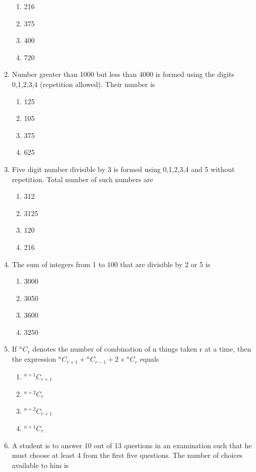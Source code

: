 \documentclass[journal,12pt,twocolumn]{IEEEtran}
\newcommand*{\Comb}[2]{{}^{#1}C_{#2}}%
\begin{document}
\begin{enumerate}
\begin{enumerate}
\item 216
\item 375
\item 400
\item 720
\end{enumerate}
\item Number greater than 1000 but less than 4000 is formed using the digits 0,1,2,3,4 (repetition allowed). Their number is 
\begin{enumerate}
\item 125
\item 105 
\item 375
\item 625\\
\end{enumerate}
\item Five digit number divisible by 3 is formed using 0,1,2,3,4 and 5 without repetition. Total number of such numbers are
\begin{enumerate}
\item 312
\item 3125 
\item 120
\item 216\\
\end{enumerate}
\item The sum of integers from 1 to 100 that are divisible by 2 or 5 is
\begin{enumerate}
\item 3000
\item 3050
\item 3600
\item 3250\\
\end{enumerate}
\item If $\Comb{n}{r}$ denotes the number of combination of n things taken r at a time, then the expression $\Comb{n}{r+1}+\Comb{n}{r-1}+2 \times \Comb{n}{r}$ equals
\begin{enumerate}
\item $\Comb{n+1}{r+1}$
\item $\Comb{n+2}{r}$
\item $\Comb{n+2}{r+1}$
\item $\Comb{n+1}{r}$\\
\end{enumerate}
\item A student is to answer 10 out of 13 questions in an examination such that he must choose at least 4 from the first five questions. The number of choices available to him is

\end{enumerate}
\end{document}
